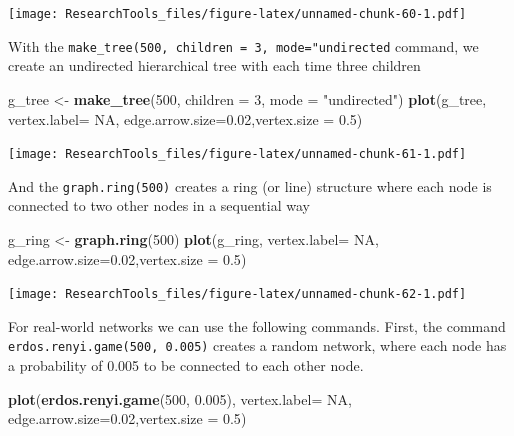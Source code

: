\documentclass[]{article}
\newenvironment{Shaded}{\begin{snugshade}}{\end{snugshade}}
\newcommand{\KeywordTok}[1]{\textcolor[rgb]{0.13,0.29,0.53}{\textbf{#1}}}
\newcommand{\DataTypeTok}[1]{\textcolor[rgb]{0.13,0.29,0.53}{#1}}
\newcommand{\DecValTok}[1]{\textcolor[rgb]{0.00,0.00,0.81}{#1}}
\newcommand{\FloatTok}[1]{\textcolor[rgb]{0.00,0.00,0.81}{#1}}
\newcommand{\StringTok}[1]{\textcolor[rgb]{0.31,0.60,0.02}{#1}}
\newcommand{\OtherTok}[1]{\textcolor[rgb]{0.56,0.35,0.01}{#1}}
\newcommand{\NormalTok}[1]{#1}
\theoremstyle{definition}
\theoremstyle{definition}
\theoremstyle{definition}
\theoremstyle{remark}
\begin{document}
\texttt{[image: ResearchTools\_files/figure-latex/unnamed-chunk-60-1.pdf]}

With the \texttt{make\_tree(500,\ children\ =\ 3,\ mode="undirected}
command, we create an undirected hierarchical tree with each time three
children

\begin{Shaded}
\begin{Highlighting}[]
\NormalTok{g_tree <-}\StringTok{ }\KeywordTok{make_tree}\NormalTok{(}\DecValTok{500}\NormalTok{, }\DataTypeTok{children =} \DecValTok{3}\NormalTok{, }\DataTypeTok{mode =} \StringTok{"undirected"}\NormalTok{)}
\KeywordTok{plot}\NormalTok{(g_tree, }\DataTypeTok{vertex.label=} \OtherTok{NA}\NormalTok{, }\DataTypeTok{edge.arrow.size=}\FloatTok{0.02}\NormalTok{,}\DataTypeTok{vertex.size =} \FloatTok{0.5}\NormalTok{)}
\end{Highlighting}
\end{Shaded}

\texttt{[image: ResearchTools\_files/figure-latex/unnamed-chunk-61-1.pdf]}

And the \texttt{graph.ring(500)} creates a ring (or line) structure
where each node is connected to two other nodes in a sequential way

\begin{Shaded}
\begin{Highlighting}[]
\NormalTok{g_ring <-}\StringTok{ }\KeywordTok{graph.ring}\NormalTok{(}\DecValTok{500}\NormalTok{)}
\KeywordTok{plot}\NormalTok{(g_ring, }\DataTypeTok{vertex.label=} \OtherTok{NA}\NormalTok{, }\DataTypeTok{edge.arrow.size=}\FloatTok{0.02}\NormalTok{,}\DataTypeTok{vertex.size =} \FloatTok{0.5}\NormalTok{)}
\end{Highlighting}
\end{Shaded}

\texttt{[image: ResearchTools\_files/figure-latex/unnamed-chunk-62-1.pdf]}

For real-world networks we can use the following commands. First, the
command \texttt{erdos.renyi.game(500,\ 0.005)} creates a random network,
where each node has a probability of 0.005 to be connected to each other
node.

\begin{Shaded}
\begin{Highlighting}[]
\KeywordTok{plot}\NormalTok{(}\KeywordTok{erdos.renyi.game}\NormalTok{(}\DecValTok{500}\NormalTok{, }\FloatTok{0.005}\NormalTok{), }\DataTypeTok{vertex.label=} \OtherTok{NA}\NormalTok{, }\DataTypeTok{edge.arrow.size=}\FloatTok{0.02}\NormalTok{,}\DataTypeTok{vertex.size =} \FloatTok{0.5}\NormalTok{)}
\end{Highlighting}
\end{Shaded}
\end{document}
